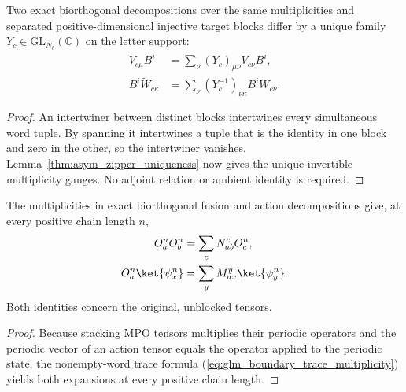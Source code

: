 \begin{lemma}
    \leanok
    \label{thm:glm_boundary_multiplicity_gauge}
    Two exact biorthogonal decompositions over the same multiplicities
    and separated positive-dimensional injective target blocks differ
    by a unique family $Y_c\in\mathrm{GL}_{N_c}(\mathbb C)$ on the
    letter support:
    \begin{align}
        \widetilde V_{c\mu}B^i
         & =\sum_\nu(Y_c)_{\mu\nu}V_{c\nu}B^i,         \\
        B^i\widetilde W_{c\kappa}
         & =\sum_\nu(Y_c^{-1})_{\nu\kappa}B^iW_{c\nu}.
        \label{eq:glm_boundary_multiplicity_gauge}
    \end{align}
\end{lemma}
\begin{proof}
    \leanok
    An intertwiner between distinct blocks intertwines every simultaneous
    word tuple. By spanning it intertwines a tuple that is the identity
    in one block and zero in the other, so the intertwiner vanishes.
    Lemma~\ref{thm:asym_zipper_uniqueness} now gives the unique
    invertible multiplicity gauges. No adjoint relation or ambient
    identity is required.
\end{proof}

\begin{lemma}
    \leanok
    \label{thm:glm_boundary_periodic_expansions}
    The multiplicities in exact biorthogonal fusion and action decompositions
    give, at every positive chain length $n$,
    \begin{align}
        O_a^nO_b^n          & =\sum_cN_{ab}^cO_c^n,          \\
        O_a^n\ket{\psi_x^n} & =\sum_yM_{ax}^y\ket{\psi_y^n}.
        \label{eq:glm_boundary_periodic_expansions}
    \end{align}
    Both identities concern the original, unblocked tensors.
\end{lemma}
\begin{proof}
    \leanok
    Because stacking MPO tensors multiplies their periodic operators and the
    periodic vector of an action tensor equals the operator applied to the
    periodic state, the nonempty-word trace formula
    (\ref{eq:glm_boundary_trace_multiplicity}) yields both expansions at every
    positive chain length.
\end{proof}

